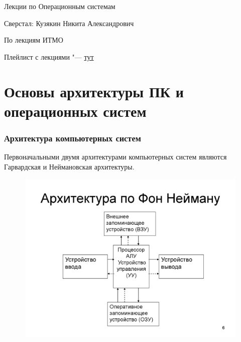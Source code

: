 \documentclass[bachelor, och, book]{SCWorks}
\theoremstyle{remark}
\begin{document}
    \hfill \break
    \hfill \break
    \hfill \break
    \hfill \break
    \hfill \break
    \hfill \break
    \hfill \break
    \hfill \break
    \hfill \break
    \hfill \break
    \hfill \break
    \hfill \break
    \begin{center}
        \Huge Лекции по Операционным системам
    \end{center}
    \hfill \break
    \hfill \break
    \hfill \break
    \hfill \break
    \hfill \break
    \hfill \break
    \hfill \break
    \hfill \break
    \hfill \break

    \begin{center} Сверстал: Кузякин Никита Александрович \end{center}
    \begin{center} По лекциям ИТМО \end{center}
    \begin{center}Плейлист с лекциями "--- \href{https://www.youtube.com/watch?v=NctMiqgVRxA&list=PLBWafxh1dFuyGGcWXmR_EngRkoUWvDFJi&index=1}{тут}\end{center}
    \thispagestyle{empty} %
     
    \newpage
    \tableofcontents

    \part{Основы архитектуры ПК и операционных систем}
    \section{Архитектура компьютерных систем}

    Первоначальными двумя архитектурами компьютерных систем являются Гарвардская и Неймановская архитектуры.

    \begin{figure}[H]
        \begin{center}
            \includegraphics[scale=0.7]{res/Neumann_architecture.png}
        \end{center}
    \end{figure}
\end{document}
